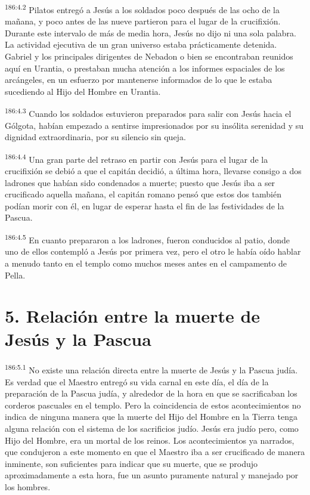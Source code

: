 \par 
\textsuperscript{186:4.2} Pilatos entregó a Jesús a los soldados poco después de las ocho de la mañana, y poco antes de las nueve partieron para el lugar de la crucifixión. Durante este intervalo de más de media hora, Jesús no dijo ni una sola palabra. La actividad ejecutiva de un gran universo estaba prácticamente detenida. Gabriel y los principales dirigentes de Nebadon o bien se encontraban reunidos aquí en Urantia, o prestaban mucha atención a los informes espaciales de los arcángeles, en un esfuerzo por mantenerse informados de lo que le estaba sucediendo al Hijo del Hombre en Urantia.

\par 
\textsuperscript{186:4.3} Cuando los soldados estuvieron preparados para salir con Jesús hacia el Gólgota, habían empezado a sentirse impresionados por su insólita serenidad y su dignidad extraordinaria, por su silencio sin queja.

\par 
\textsuperscript{186:4.4} Una gran parte del retraso en partir con Jesús para el lugar de la crucifixión se debió a que el capitán decidió, a última hora, llevarse consigo a dos ladrones que habían sido condenados a muerte; puesto que Jesús iba a ser crucificado aquella mañana, el capitán romano pensó que estos dos también podían morir con él, en lugar de esperar hasta el fin de las festividades de la Pascua.

\par 
\textsuperscript{186:4.5} En cuanto prepararon a los ladrones, fueron conducidos al patio, donde uno de ellos contempló a Jesús por primera vez, pero el otro le había oído hablar a menudo tanto en el templo como muchos meses antes en el campamento de Pella.

\section*{5. Relación entre la muerte de Jesús y la Pascua}
\par 
\textsuperscript{186:5.1} No existe una relación directa entre la muerte de Jesús y la Pascua judía. Es verdad que el Maestro entregó su vida carnal en este día, el día de la preparación de la Pascua judía, y alrededor de la hora en que se sacrificaban los corderos pascuales en el templo. Pero la coincidencia de estos acontecimientos no indica de ninguna manera que la muerte del Hijo del Hombre en la Tierra tenga alguna relación con el sistema de los sacrificios judío. Jesús era judío pero, como Hijo del Hombre, era un mortal de los reinos. Los acontecimientos ya narrados, que condujeron a este momento en que el Maestro iba a ser crucificado de manera inminente, son suficientes para indicar que su muerte, que se produjo aproximadamente a esta hora, fue un asunto puramente natural y manejado por los hombres.

